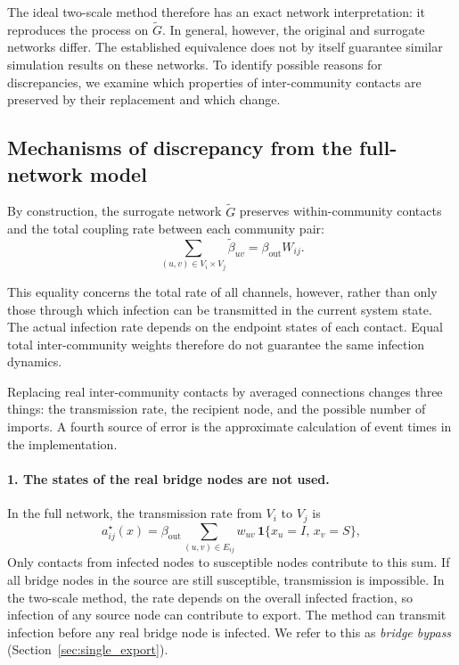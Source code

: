 \documentclass[a4paper,fleqn]{cas-sc}
\newcommand{\ind}{\mathbf{1}}
\begin{document}
The ideal two-scale method therefore has an exact network interpretation: it reproduces the process on $\tilde G$. In general, however, the original and surrogate networks differ. The established equivalence does not by itself guarantee similar simulation results on these networks. To identify possible reasons for discrepancies, we examine which properties of inter-community contacts are preserved by their replacement and which change.

\subsection{Mechanisms of discrepancy from the full-network model}
\label{sec:sources}

By construction, the surrogate network $\tilde G$ preserves within-community contacts and the total coupling rate between each community pair:
\[
\sum_{(u,v)\in V_i\times V_j}\tilde\beta_{uv}
=
\beta_{\mathrm{out}}W_{ij}.
\]

This equality concerns the total rate of all channels, however, rather than only those through which infection can be transmitted in the current system state. The actual infection rate depends on the endpoint states of each contact. Equal total inter-community weights therefore do not guarantee the same infection dynamics.

Replacing real inter-community contacts by averaged connections changes three things: the transmission rate, the recipient node, and the possible number of imports. A fourth source of error is the approximate calculation of event times in the implementation.

\paragraph{1. The states of the real bridge nodes are not used.}
In the full network, the transmission rate from $V_i$ to $V_j$ is
\begin{equation}
\label{eq:exact_rate}
a^\star_{ij}(x)=\beta_{\mathrm{out}}\sum_{(u,v)\in E_{ij}}w_{uv}\,\ind\{x_u=I,\,x_v=S\},
\end{equation}
Only contacts from infected nodes to susceptible nodes contribute to this sum. If all bridge nodes in the source are still susceptible, transmission is impossible. In the two-scale method, the rate depends on the overall infected fraction, so infection of any source node can contribute to export. The method can transmit infection before any real bridge node is infected. We refer to this as \emph{bridge bypass} (Section~\ref{sec:single_export}).
\end{document}
